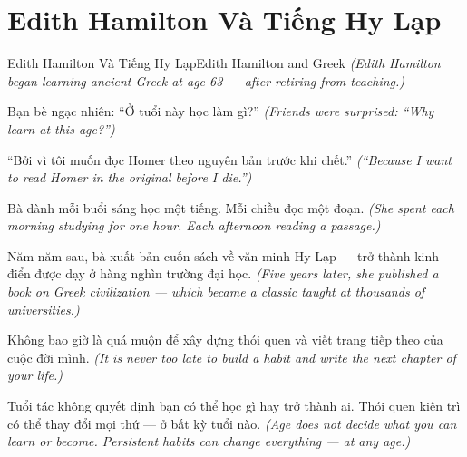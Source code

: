 \section{Edith Hamilton Và Tiếng Hy Lạp}
\begin{truyen}{Edith Hamilton Và Tiếng Hy Lạp}{Edith Hamilton and Greek}
\textit{(Edith Hamilton began learning ancient Greek at age 63 — after retiring from teaching.)}

Bạn bè ngạc nhiên: ``Ở tuổi này học làm gì?''
\textit{(Friends were surprised: ``Why learn at this age?'')}

``Bởi vì tôi muốn đọc Homer theo nguyên bản trước khi chết.''
\textit{(``Because I want to read Homer in the original before I die.'')}

Bà dành mỗi buổi sáng học một tiếng. Mỗi chiều đọc một đoạn.
\textit{(She spent each morning studying for one hour. Each afternoon reading a passage.)}

Năm năm sau, bà xuất bản cuốn sách về văn minh Hy Lạp — trở thành kinh điển được dạy ở hàng nghìn trường đại học.
\textit{(Five years later, she published a book on Greek civilization — which became a classic taught at thousands of universities.)}

Không bao giờ là quá muộn để xây dựng thói quen và viết trang tiếp theo của cuộc đời mình.
\textit{(It is never too late to build a habit and write the next chapter of your life.)}

\end{truyen}

\begin{baihoc}
Tuổi tác không quyết định bạn có thể học gì hay trở thành ai. Thói quen kiên trì có thể thay đổi mọi thứ — ở bất kỳ tuổi nào.
\textit{(Age does not decide what you can learn or become. Persistent habits can change everything — at any age.)}
\end{baihoc}
\ngancach

